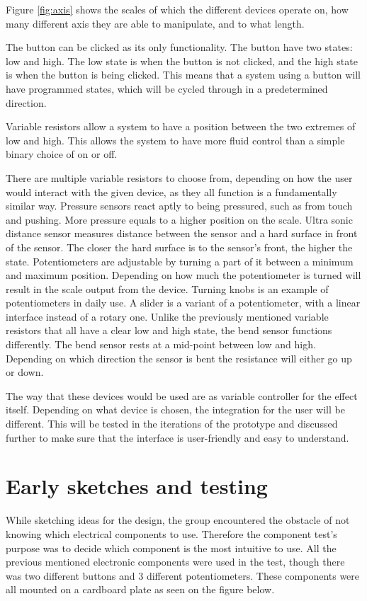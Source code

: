 Figure \ref{fig:axis} shows the scales of which the different devices operate on, how many different axis they are able to manipulate, and to what length.
 
The button can be clicked as its only functionality. The button have two states: low and high. The low state is when the button is not clicked, and the high state is when the button is being clicked. This means that a system using a button will have programmed states, which will be cycled through in a predetermined direction.

Variable resistors allow a system to have a position between the two extremes of low and high. This allows the system to have more fluid control than a simple binary choice of on or off.

There are multiple variable resistors to choose from, depending on how the user would interact with the given device, as they all function is a fundamentally similar way. Pressure sensors react aptly to being pressured, such as from touch and pushing. More pressure equals to a higher position on the scale.
Ultra sonic distance sensor measures distance between the sensor and a hard surface in front of the sensor. The closer the hard surface is to the sensor's front, the higher the state.
Potentiometers are adjustable by turning a part of it between a minimum and maximum position. Depending on how much the potentiometer is turned will result in the scale output from the device. Turning knobs is an example of potentiometers in daily use.
A slider is a variant of a potentiometer, with a linear interface instead of a rotary one.
Unlike the previously mentioned variable resistors that all have a clear low and high state, the bend sensor functions differently. The bend sensor rests at a mid-point between low and high. Depending on which direction the sensor is bent the resistance will either go up or down.

The way that these devices would be used are as variable controller for the effect itself. Depending on what device is chosen, the integration for the user will be different. This will be tested in the iterations of the prototype and discussed further to make sure that the interface is user-friendly and easy to understand. 


\section{Early sketches and testing}
While sketching ideas for the design, the group encountered the obstacle of not knowing which electrical components to use. Therefore the component test's purpose was to decide which component is the most intuitive to use. All the previous mentioned electronic components were used in the test, though there was two different buttons and 3 different potentiometers.
These components were all mounted on a cardboard plate as seen on the figure below.


